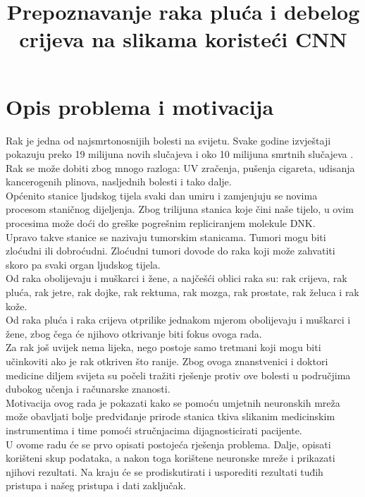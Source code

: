 \documentclass[conference, utf8]{IEEEtran}
\begin{document}
	
	\title{Prepoznavanje raka pluća i debelog crijeva na slikama koristeći CNN}
	
	\author{
		\and
		\and
		\and
		\and
		\and
		}
	
	\maketitle
	
	\section{Opis problema i motivacija}
	Rak je jedna od najsmrtonosnijih bolesti na svijetu. Svake godine izvještaji pokazuju preko 19 milijuna novih slučajeva i oko 10 milijuna smrtnih slučajeva \cite{world2019international}. Rak se može dobiti zbog mnogo razloga: UV zračenja, pušenja cigareta, udisanja kancerogenih plinova, nasljednih bolesti i tako dalje.
	\\
	Općenito stanice ljudskog tijela svaki dan umiru i zamjenjuju se novima procesom staničnog dijeljenja. Zbog trilijuna stanica koje čini naše tijelo, u ovim procesima može doći do greške pogrešnim repliciranjem molekule DNK.
	\\
	Upravo takve stanice se nazivaju tumorskim stanicama. Tumori mogu biti zloćudni ili dobroćudni. Zloćudni tumori dovode do raka koji može zahvatiti skoro pa svaki organ ljudskog tijela.
	\\
	Od raka obolijevaju i muškarci i žene, a najčešći oblici raka su: rak crijeva, rak pluća, rak jetre, rak dojke, rak rektuma, rak mozga, rak prostate, rak želuca i rak kože.
	\\
	Od raka pluća i raka crijeva otprilike jednakom mjerom obolijevaju i muškarci i žene, zbog čega će njihovo otkrivanje biti fokus ovoga rada.
	\\
	Za rak još uvijek nema lijeka, nego postoje samo tretmani koji mogu biti učinkoviti ako je rak otkriven što ranije.
	Zbog ovoga znanstvenici i doktori medicine diljem svijeta su počeli tražiti rješenje protiv ove bolesti u područjima dubokog učenja i računarske znanosti.
	\\
	Motivacija ovog rada je pokazati kako se pomoću umjetnih neuronskih mreža može obavljati bolje predviđanje prirode stanica tkiva slikanim medicinskim instrumentima i time pomoći stručnjacima dijagnosticirati pacijente.
	\\
	U ovome radu će se prvo opisati postojeća rješenja problema. Dalje, opisati korišteni skup podataka, a nakon toga korištene neuronske mreže i prikazati njihovi rezultati. Na kraju će se prodiskutirati i usporediti rezultati tuđih pristupa i našeg pristupa i dati zaključak.
 
\end{document}
